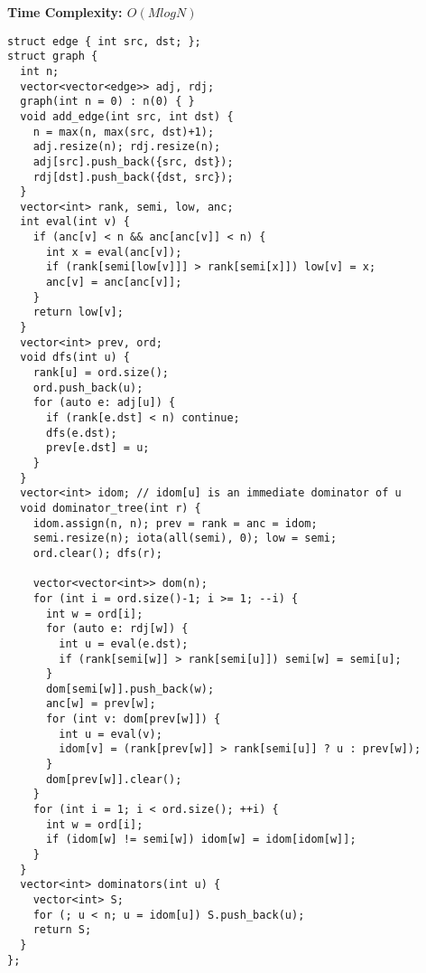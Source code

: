 
\textbf{Time Complexity: $O(M log N)$}\\
\begin{lstlisting}
struct edge { int src, dst; };
struct graph {
  int n;
  vector<vector<edge>> adj, rdj;
  graph(int n = 0) : n(0) { } 
  void add_edge(int src, int dst) {
    n = max(n, max(src, dst)+1);
    adj.resize(n); rdj.resize(n);
    adj[src].push_back({src, dst});
    rdj[dst].push_back({dst, src});
  }
  vector<int> rank, semi, low, anc;
  int eval(int v) { 
    if (anc[v] < n && anc[anc[v]] < n) {
      int x = eval(anc[v]);
      if (rank[semi[low[v]]] > rank[semi[x]]) low[v] = x;
      anc[v] = anc[anc[v]];
    }
    return low[v];
  }
  vector<int> prev, ord;
  void dfs(int u) {
    rank[u] = ord.size();
    ord.push_back(u);
    for (auto e: adj[u]) {
      if (rank[e.dst] < n) continue;
      dfs(e.dst);
      prev[e.dst] = u;
    }
  }
  vector<int> idom; // idom[u] is an immediate dominator of u
  void dominator_tree(int r) {
    idom.assign(n, n); prev = rank = anc = idom;
    semi.resize(n); iota(all(semi), 0); low = semi;
    ord.clear(); dfs(r);

    vector<vector<int>> dom(n);
    for (int i = ord.size()-1; i >= 1; --i) {
      int w = ord[i];
      for (auto e: rdj[w]) {
        int u = eval(e.dst);
        if (rank[semi[w]] > rank[semi[u]]) semi[w] = semi[u];
      }
      dom[semi[w]].push_back(w);
      anc[w] = prev[w];
      for (int v: dom[prev[w]]) {
        int u = eval(v);
        idom[v] = (rank[prev[w]] > rank[semi[u]] ? u : prev[w]);
      }
      dom[prev[w]].clear();
    }
    for (int i = 1; i < ord.size(); ++i) {
      int w = ord[i];
      if (idom[w] != semi[w]) idom[w] = idom[idom[w]];
    }
  }
  vector<int> dominators(int u) {
    vector<int> S;
    for (; u < n; u = idom[u]) S.push_back(u);
    return S;
  }
};
\end{lstlisting}